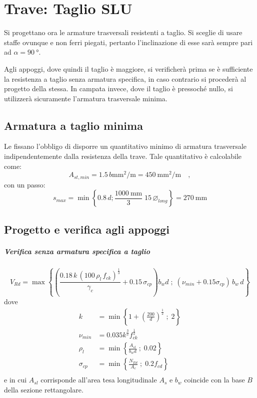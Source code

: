 \chapter{Trave: Taglio SLU}
Si progettano ora le armature trasversali resistenti a taglio. 
Si sceglie di usare staffe ovunque e non ferri piegati, pertanto l'inclinazione di esse sarà sempre pari ad $\alpha = \SI{90}{\degree}$.

Agli appoggi, dove quindi il taglio è maggiore, si verificherà prima se è sufficiente la resistenza a taglio senza armatura specifica, in caso contrario si procederà al progetto della stessa.
In campata invece, dove il taglio è pressoché nullo, si utilizzerà sicuramente l'armatura trasversale minima.

\section{Armatura a taglio minima}
Le  fissano l'obbligo di disporre un quantitativo minimo di armatura trasversale indipendentemente dalla resistenza della trave. 
Tale quantitativo è calcolabile come:
\begin{equation}
    A_{st, min} = \num{1.5} \, b \si{\milli\metre\squared\per\metre} = \SI{450}{\milli\metre\squared\per\metre} \quad ,
\end{equation}
con un passo:
\begin{equation}
    s_{max} = \min \left\{ 0.8\,d ; \frac{\SI{1000}{\milli\metre}}{3} \; 15\, \varnothing_{long} \right\} = \SI{270}{\milli\metre}
\end{equation} 

\section{Progetto e verifica agli appoggi}
\paragraph{Verifica senza armatura specifica a taglio}
\begin{equation}
    V_{Rd} = \max \left\{ \left(\frac{0.18 \, k \, (100 \, \rho_l \, f_{ck})^{\tfrac{1}{3}}}{\gamma_c} + 0.15 \, \sigma _{cp}\right) b_w d \; ; \;(\nu_{min} + 0.15\sigma _{cp}) \, b_w \, d \right\}
\end{equation}
dove 
\[
    \begin{split}
        k &= \min \left\{ 1 + \left(\frac{200}{d}\right)^ {\tfrac{1}{2}} \; ; \; 2\right\} \\
        \nu_{min} &= 0.035 k ^ \frac{3}{2} f_{ck}^ \frac{1}{2} \\
        \rho_l &= \min \left\{ \frac{A_{sl}}{b_w d} \; ; \; 0.02\right\} \\
        \sigma_{cp} &= \min \left\{ \frac{N_{Ed}}{A_c} \; ; \; 0.2 f_{cd} \right\} \\
    \end{split}
\]
e in cui $A_{sl}$ corrisponde all'area tesa longitudinale $A_s$ e $b_w$ coincide con la base $B$ della sezione rettangolare.

